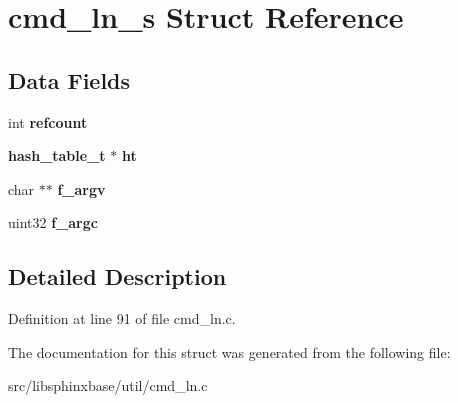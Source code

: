 \section{cmd\+\_\+ln\+\_\+s Struct Reference}
\label{structcmd__ln__s}
\subsection*{Data Fields}
\begin{DoxyCompactItemize}
\item 
\mbox{\label{structcmd__ln__s_a63fe07841bd076831696553d41fa5d2e}} 
int {\bfseries refcount}
\item 
\mbox{\label{structcmd__ln__s_a108567dbe131b18b5c795a7cec122748}} 
\textbf{ hash\+\_\+table\+\_\+t} $\ast$ {\bfseries ht}
\item 
\mbox{\label{structcmd__ln__s_a1c4c926ebe10d7fd9664573f4b173aa8}} 
char $\ast$$\ast$ {\bfseries f\+\_\+argv}
\item 
\mbox{\label{structcmd__ln__s_a51088e3e7e8477f185ebc07aeb20d63f}} 
uint32 {\bfseries f\+\_\+argc}
\end{DoxyCompactItemize}


\subsection{Detailed Description}


Definition at line 91 of file cmd\+\_\+ln.\+c.



The documentation for this struct was generated from the following file\+:\begin{DoxyCompactItemize}
\item 
src/libsphinxbase/util/cmd\+\_\+ln.\+c\end{DoxyCompactItemize}
